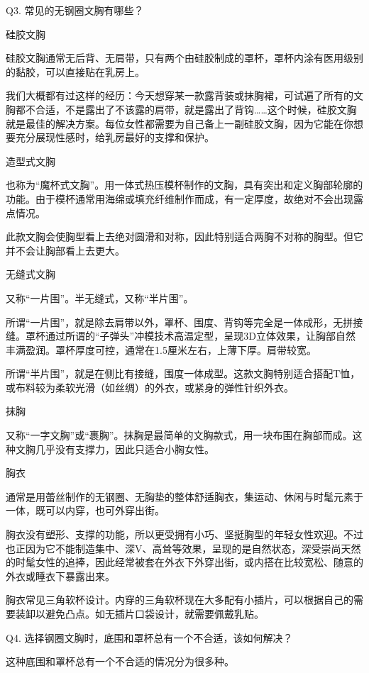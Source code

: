 \documentclass[12pt,UTF8]{ctexbook}
\begin{document}
Q3. 常见的无钢圈文胸有哪些？


硅胶文胸

硅胶文胸通常无后背、无肩带，只有两个由硅胶制成的罩杯，罩杯内涂有医用级别的黏胶，可以直接贴在乳房上。

我们大概都有过这样的经历：今天想穿某一款露背装或抹胸裙，可试遍了所有的文胸都不合适，不是露出了不该露的肩带，就是露出了背钩……这个时候，硅胶文胸就是最佳的解决方案。每位女性都需要为自己备上一副硅胶文胸，因为它能在你想要充分展现性感时，给乳房最好的支撑和保护。

造型式文胸

也称为“魔杯式文胸”。用一体式热压模杯制作的文胸，具有突出和定义胸部轮廓的功能。由于模杯通常用海绵或填充纤维制作而成，有一定厚度，故绝对不会出现露点情况。

此款文胸会使胸型看上去绝对圆滑和对称，因此特别适合两胸不对称的胸型。但它并不会让胸部看上去更大。

无缝式文胸

又称“一片围”。半无缝式，又称“半片围”。

所谓“一片围”，就是除去肩带以外，罩杯、围度、背钩等完全是一体成形，无拼接缝。罩杯通过所谓的“子弹头”冲模技术高温定型，呈现3D立体效果，让胸部自然丰满盈润。罩杯厚度可控，通常在1.5厘米左右，上薄下厚。肩带较宽。

所谓“半片围”，就是在侧比有接缝，围度一体成型。这款文胸特别适合搭配T恤，或布料较为柔软光滑（如丝绸）的外衣，或紧身的弹性针织外衣。

抹胸

又称“一字文胸”或“裹胸”。抹胸是最简单的文胸款式，用一块布围在胸部而成。这种文胸几乎没有支撑力，因此只适合小胸女性。

胸衣

通常是用蕾丝制作的无钢圈、无胸垫的整体舒适胸衣，集运动、休闲与时髦元素于一体，既可以内穿，也可外穿出街。

胸衣没有塑形、支撑的功能，所以更受拥有小巧、坚挺胸型的年轻女性欢迎。不过也正因为它不能制造集中、深V、高耸等效果，呈现的是自然状态，深受崇尚天然的时髦女性的追捧，因此经常被套在外衣下外穿出街，或内搭在比较宽松、随意的外衣或睡衣下暴露出来。

胸衣常见三角软杯设计。内穿的三角软杯现在大多配有小插片，可以根据自己的需要装卸以避免凸点。如无插片口袋设计，就需要佩戴乳贴。





Q4. 选择钢圈文胸时，底围和罩杯总有一个不合适，该如何解决？


这种底围和罩杯总有一个不合适的情况分为很多种。
\end{document}
